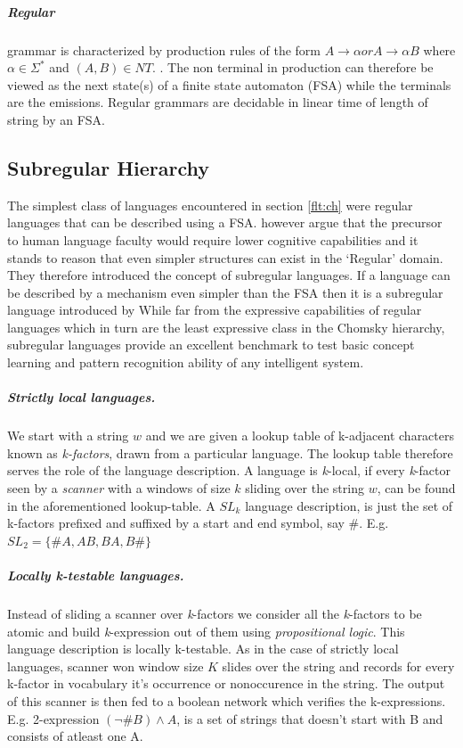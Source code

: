 \subparagraph{Regular} grammar is characterized by production rules of the form $A \rightarrow \alpha or A \rightarrow \alpha B$ where $\alpha \in \Sigma^{*}$ and $(A, B) \in NT$. . The non terminal in production can therefore be viewed as the next state(s) of a finite state automaton (FSA) while the terminals are the emissions. Regular grammars are decidable in linear time of length of string by an FSA.


\subsection{Subregular Hierarchy}\label{flt:sh}
The simplest class of languages encountered in section \ref{flt:ch} were regular languages that can be described using a FSA. \cite{Jager2012} however argue that the precursor to human language faculty would require lower cognitive capabilities and it stands to reason that even simpler structures can exist in the \lq Regular\rq{} domain. They therefore introduced the concept of subregular languages. If a language can be described by a mechanism even simpler than the FSA then it is a subregular language introduced by While far from the expressive capabilities of regular languages which in turn are the least expressive class in the Chomsky hierarchy, subregular languages provide an excellent benchmark to test basic concept learning and pattern recognition ability of any intelligent system.

\subparagraph{Strictly local languages.} We start with a string $w$ and we are given a lookup table of k-adjacent characters known as \textit{k-factors}, drawn from a particular language. The lookup table therefore serves the role of the language description. A language is \textit{k}-local, if every \textit{k}-factor seen by a \textit{scanner} with a windows of size $k$ sliding over the string $w$, can be found in the aforementioned lookup-table. A $SL_k$ language description, is just the set of k-factors prefixed and suffixed by a start and end symbol, say $\#$. E.g. $SL_2 = \{\#A,AB,BA,B\#\}$   

\subparagraph{Locally k-testable languages.} Instead of sliding a scanner over \textit{k}-factors we consider all the \textit{k}-factors to be atomic and build \textit{k}-expression out of them using \textit{propositional logic}. This language description is locally k-testable. As in the case of strictly local languages, scanner won window size $K$ slides over the string and records for every k-factor in vocabulary it's occurrence or nonoccurence in the string. The output of this scanner is then fed to a boolean network which verifies the k-expressions. E.g. 2-expression $(\neg \# B) \wedge A$, is a set of strings that doesn't start with B and consists of atleast one A.


